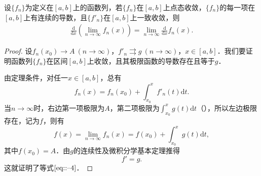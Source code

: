\documentclass[../../main.tex]{subfiles}%
\begin{document}
\begin{theorem}[可微性]\label{theorem:函数项级数的逐项可微性}
设\(\{f_n\}\)为定义在\([a, b]\)上的函数列，若\(\{f_n\}\)在$[a, b]$上点态收敛，\(\{f_n\}\)的每一项在\([a, b]\)上有连续的导数，且\(\{f'_n\}\)在\([a, b]\)上一致收敛，则
\begin{align}
\frac{\mathrm{d}}{\mathrm{d}x} \left( \lim_{n \to \infty} f_n(x) \right) = \lim_{n \to \infty} \frac{\mathrm{d}}{\mathrm{d}x} f_n(x). \label{eq::--4}
\end{align}
\end{theorem}
\begin{proof}

设\(f_n(x_0) \to A \ (n \to \infty)\)，\(f'_n \rightrightarrows g \ (n \to \infty)\)，\(x \in [a, b]\)．我们要证明函数列\(\{f_n\}\)在区间\([a, b]\)上收敛，且其极限函数的导数存在且等于\(g\)．

由定理条件，对任一\(x \in [a, b]\)，总有
\[
f_n(x) = f_n(x_0) + \int_{x_0}^x f'_n(t) \mathrm{d}t.
\]
当\(n \to \infty\)时，右边第一项极限为\(A\)，第二项极限为\(\int_{x_0}^x g(t) \mathrm{d}t\)（），所以左边极限存在，记为\(f\)，则有
\[
f(x) = \lim_{n \to \infty} f_n(x) = f(x_0) + \int_{x_0}^x g(t) \mathrm{d}t,
\]其中\(f(x_0) = A\)．由\(g\)的连续性及微积分学基本定理推得
\[
f' = g.
\]
这就证明了等式\(\eqref{eq::--4}\)．

\end{proof}
\end{document}
